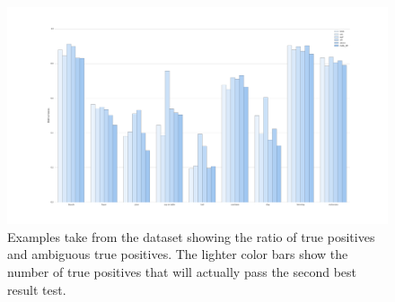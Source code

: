 \begin{figure}[t]
\centerline{%
		\includegraphics[width=0.98\linewidth]{imgs/false_positives.pdf}}
    \vspace{-2mm} 
	\caption{Examples take from the dataset showing the ratio of true positives and ambiguous true positives. The lighter color bars show the number of true positives that will actually pass the second best result test.}
	\label{fig:false_positives}
\end{figure}